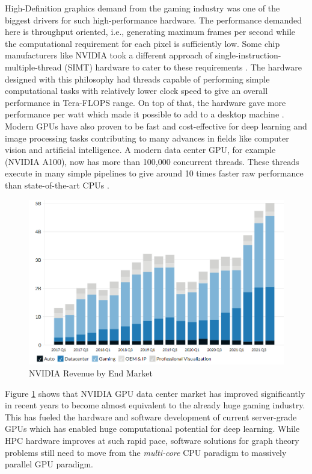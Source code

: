 High-Definition graphics demand from the gaming industry was one of the biggest drivers for such high-performance hardware.
The performance demanded here is throughput oriented, i.e., generating maximum frames per second while the computational requirement for each pixel is sufficiently low.
Some chip manufacturers like NVIDIA took a different approach of single-instruction-multiple-thread (SIMT) hardware to cater to these requirements \cite{GPUs_and_gaming}.
The hardware designed with this philosophy had threads capable of performing simple computational tasks with relatively lower clock speed to give an overall performance in Tera-FLOPS range.
On top of that, the hardware gave more performance per watt which made it possible to add to a desktop machine \cite{ppw_gpu_vs_cpu}.
Modern GPUs have also proven to be fast and cost-effective for deep learning and image processing tasks contributing to many advances in fields like computer vision and artificial intelligence. A modern data center GPU, for example (NVIDIA A100), now has more than 100,000 concurrent threads. These threads execute in many simple pipelines to give around 10 times faster raw performance than state-of-the-art CPUs \cite{GPU_book_wen-mei}.
\begin{figure}
    \centering
    \includegraphics[width=\textwidth]{fig/Nvidia-revenue-by-end-market.png}
    \caption{NVIDIA Revenue by End Market}
    \label{fig:Nvidia-revenue}
\end{figure}

Figure \ref{fig:Nvidia-revenue} shows that NVIDIA GPU data center market has improved significantly in recent years to become almost equivalent to the already huge gaming industry.
This has fueled the hardware and software development of current server-grade GPUs which has enabled huge computational potential for deep learning.
While HPC hardware improves at such rapid pace, software solutions for graph theory problems still need to move from the \textit{multi-core} CPU paradigm to massively parallel GPU paradigm.


